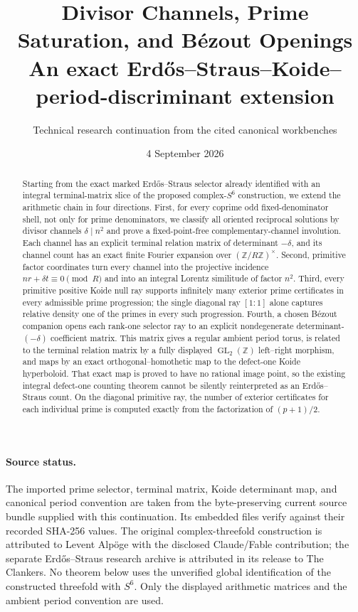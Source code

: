 \documentclass[11pt]{article}
\title{Divisor Channels, Prime Saturation, and Bézout Openings\\
\large An exact Erdős--Straus--Koide--period-discriminant extension}
\author{Technical research continuation from the cited canonical workbenches}
\date{4 September 2026}
\theoremstyle{definition}
\theoremstyle{remark}
\newcommand{\Z}{\mathbb Z}
\newcommand{\GL}{\operatorname{GL}}
\newcommand{\1}{\mathbf 1}
\begin{document}
\maketitle

\begin{abstract}
Starting from the exact marked Erdős--Straus selector already identified with
an integral terminal-matrix slice of the proposed complex-$S^6$ construction,
we extend the arithmetic chain in four directions.  First, for every coprime
odd fixed-denominator shell, not only for prime denominators, we classify all
oriented reciprocal solutions by divisor channels $\delta\mid n^2$ and prove
a fixed-point-free complementary-channel involution.  Each channel has an
explicit terminal relation matrix of determinant $-\delta$, and its channel
count has an exact finite Fourier expansion over
$(\Z/R\Z)^\times$.  Second, primitive factor coordinates turn every channel
into the projective incidence $nr+\delta t\equiv0\pmod R$ and into an integral
Lorentz similitude of factor $n^2$.  Third, every primitive positive Koide
null ray supports infinitely many exterior prime certificates in every
admissible prime progression; the single diagonal ray $[1:1]$ alone captures
relative density one of the primes in every such progression.  Fourth, a
chosen Bézout companion opens each rank-one selector ray to an explicit
nondegenerate determinant-$(-\delta)$ coefficient matrix.  This matrix gives
a regular ambient period torus, is related to the terminal relation matrix by
a fully displayed $\GL_2(\Z)$ left--right morphism, and maps by an exact
orthogonal--homothetic map to the defect-one Koide hyperboloid.  That exact map
is proved to have no rational image point, so the existing integral defect-one
counting theorem cannot be silently reinterpreted as an Erdős--Straus count.
On the diagonal primitive ray, the number of exterior certificates for each
individual prime is computed exactly from the factorization of $(p+1)/2$.
\end{abstract}

\paragraph{Source status.}
The imported prime selector, terminal matrix, Koide determinant map, and
canonical period convention are taken from the byte-preserving current source
bundle supplied with this continuation.  Its embedded files verify against
their recorded SHA-256 values.  The original complex-threefold construction
is attributed to Levent Alpöge with the disclosed Claude/Fable contribution;
the separate Erdős--Straus research archive is attributed in its release to
The Clankers.  No theorem below uses the unverified global identification of
the constructed threefold with $S^6$.  Only the displayed arithmetic matrices
and the ambient period convention are used.
\end{document}
